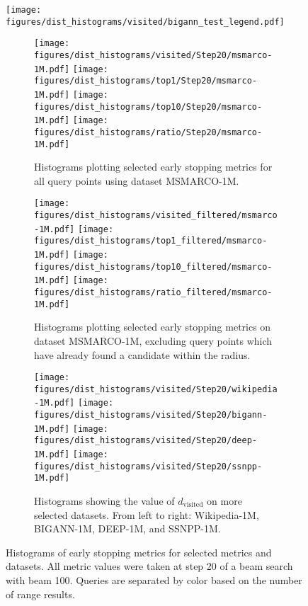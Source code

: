 \begin{figure*}
	\centering
	\texttt{[image: figures/dist\_histograms/visited/bigann\_test\_legend.pdf]} \\
	\begin{subfigure}{.85\textwidth}
		\centering
			\texttt{[image: figures/dist\_histograms/visited/Step20/msmarco-1M.pdf]}
			\texttt{[image: figures/dist\_histograms/top1/Step20/msmarco-1M.pdf]}
			\texttt{[image: figures/dist\_histograms/top10/Step20/msmarco-1M.pdf]}
			\texttt{[image: figures/dist\_histograms/ratio/Step20/msmarco-1M.pdf]}
			\caption{Histograms plotting selected early stopping metrics for all query points using dataset MSMARCO-1M.}
			\label{fig:msmarco_metrics}
	\end{subfigure}

	\begin{subfigure}{.85\textwidth}
		\centering
		\texttt{[image: figures/dist\_histograms/visited\_filtered/msmarco-1M.pdf]}
		\texttt{[image: figures/dist\_histograms/top1\_filtered/msmarco-1M.pdf]}
		\texttt{[image: figures/dist\_histograms/top10\_filtered/msmarco-1M.pdf]}
		\texttt{[image: figures/dist\_histograms/ratio\_filtered/msmarco-1M.pdf]}
		\caption{Histograms plotting selected early stopping metrics on dataset MSMARCO-1M, excluding query points which have already found a candidate within the radius.}
		\label{fig:msmarco_withexclusions}
	\end{subfigure}

		\begin{subfigure}{.85\textwidth}
		\centering
		\texttt{[image: figures/dist\_histograms/visited/Step20/wikipedia-1M.pdf]}
		\texttt{[image: figures/dist\_histograms/visited/Step20/bigann-1M.pdf]}
		\texttt{[image: figures/dist\_histograms/visited/Step20/deep-1M.pdf]}
		\texttt{[image: figures/dist\_histograms/visited/Step20/ssnpp-1M.pdf]}
		\caption{Histograms showing the value of $d_{\text{visited}}$ on more selected datasets. From left to right: Wikipedia-1M, BIGANN-1M, DEEP-1M, and SSNPP-1M.}
		\label{fig:visited_manydatasets}
	\end{subfigure}
	\vspace{3pt}
\caption{Histograms of early stopping metrics for selected metrics and datasets. All metric values were taken at step 20 of a beam search with beam 100. Queries are separated by color based on the number of range results.}
\label{fig:histograms_all}
\end{figure*}

